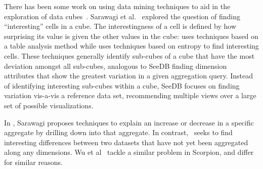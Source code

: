 There has been some  work on using data mining techniques
to aid in the exploration of data 
cubes~\cite{DBLP:conf/vldb/Sarawagi99, DBLP:conf/vldb/SatheS01, DBLP:conf/vldb/Sarawagi00, 
DBLP:conf/SIGKDD/OrdonezC09}.
Sarawagi et al.~\cite{DBLP:conf/EDBT/SarawagiAM98, DBLP:conf/vldb/Sarawagi00} 
 explored 
the question of finding ``interesting'' cells in a cube.
The interestingness of a cell is defined by how surprising
its value is given the other values in the cube:
\cite{DBLP:conf/EDBT/SarawagiAM98} uses techniques 
based on a table analysis method while
\cite{DBLP:conf/vldb/Sarawagi00} uses techniques based on entropy to find interesting cells.
These techniques generally identify sub-cubes of a cube that have the most
deviation amongst all sub-cubes, analogous to SeeDB finding dimension attributes that show
the greatest variation in a given
aggregation query.  
Instead of identifying interesting sub-cubes within a cube, SeeDB focuses on
finding variation vis-a-vis a reference data set, recommending multiple views over a 
large set of possible visualizations.



In \cite{DBLP:conf/vldb/Sarawagi99}, Sarawagi
proposes techniques to explain an
increase or decrease in a specific aggregate by drilling down into that aggregate.
In contrast, \SeeDB\ seeks to find interesting
differences between two datasets that have not yet been aggregated along any dimensions.
Wu et al~\cite{scorpion} tackle a similar problem in Scorpion,
and differ for similar reasons.


